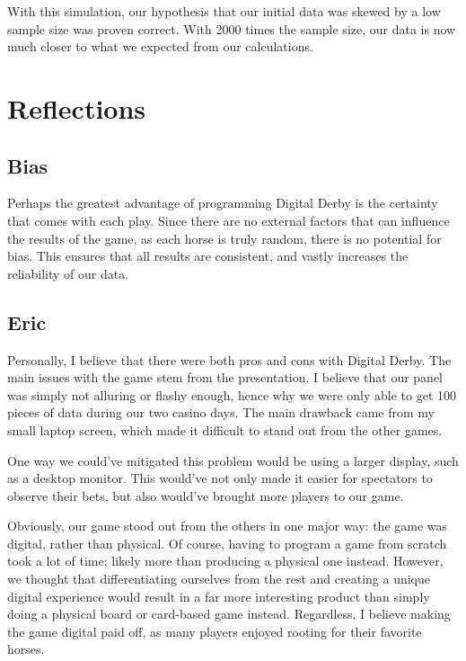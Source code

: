 \documentclass{article}
\begin{document}
{\vspace{2ex}

With this simulation, our hypothesis that our initial data was skewed by a low sample size was proven correct. With 2000 times the sample size, our data is now much closer to what we expected from our calculations.
}

\section{Reflections}
{
\subsection{Bias}
{
Perhaps the greatest advantage of programming Digital Derby is the certainty that comes with each play. Since there are no external factors that can influence the results of the game, as each horse is truly random, there is no potential for bias. This ensures that all results are consistent, and vastly increases the reliability of our data.
}
\subsection{Eric}
{
Personally, I believe that there were both pros and cons with Digital Derby. The main issues with the game stem from the presentation. I believe that our panel was simply not alluring or flashy enough, hence why we were only able to get 100 pieces of data during our two casino days. The main drawback came from my small laptop screen, which made it difficult to stand out from the other games. 

\vspace{2ex}

One way we could’ve mitigated this problem would be using a larger display, such as a desktop monitor. This would’ve not only made it easier for spectators to observe their bets, but also would’ve brought more players to our game.

\vspace{2ex}

Obviously, our game stood out from the others in one major way: the game was digital, rather than physical. Of course, having to program a game from scratch took a lot of time; likely more than producing a physical one instead. However, we thought that differentiating ourselves from the rest and creating a unique digital experience would result in a far more interesting product than simply doing a physical board or card-based game instead. Regardless, I believe making the game digital paid off, as many players enjoyed rooting for their favorite horses. 

}}
\end{document}
